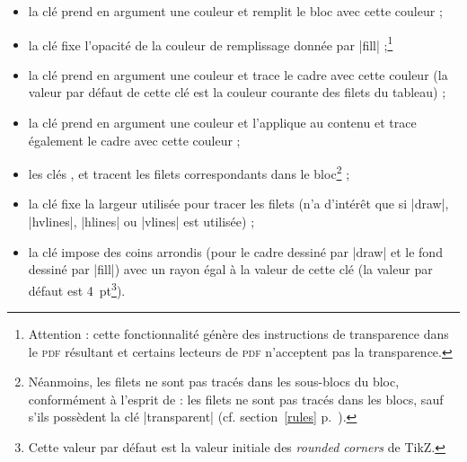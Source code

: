 \documentclass[dvipsnames]{article}%
\begin{document}
\begin{itemize}
\item {}
la clé  prend en argument une couleur et remplit le bloc
avec cette couleur ;
\item {}
la clé  fixe l'opacité de la couleur de remplissage donnée
par |fill| ;\footnote{Attention : cette fonctionnalité génère des
  instructions de transparence dans le \textsc{pdf} résultant et certains
  lecteurs de \textsc{pdf} n'acceptent pas la transparence.}
\item {}
la clé  prend en argument une couleur et trace le cadre
avec cette couleur (la valeur par défaut de cette clé est la couleur courante
des filets du tableau) ;
\item {} 
la clé  prend en argument une couleur et l'applique au
contenu et trace également le cadre avec cette couleur ;
\item {}  
les clés ,  et 
tracent les filets correspondants dans le bloc\footnote{Néanmoins, les filets ne
  sont pas tracés dans les sous-blocs du bloc, conformément à l'esprit de
  : les filets ne sont pas tracés dans les blocs, sauf s'ils
  possèdent la clé |transparent| (cf.
  section~\ref{rules} p.~\pageref{rules}).} ;
\item {}
la clé  fixe la largeur utilisée pour tracer les
filets (n'a d'intérêt que si |draw|, |hvlines|,
|hlines| ou |vlines| est utilisée) ;
\item {} 
la clé  impose des coins arrondis (pour le
cadre dessiné par |draw| et le fond dessiné par |fill|)
avec un rayon égal à la valeur de cette clé (la valeur par défaut est
4~pt\footnote{Cette valeur par défaut est la valeur initiale des \emph{rounded
    corners} de TikZ.}). 
\end{itemize}
\end{document}
